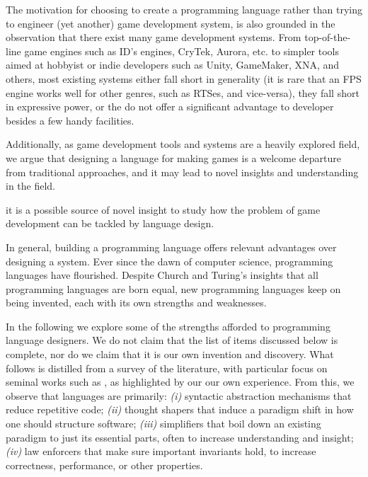 The motivation for choosing to create a programming language rather than trying to engineer (yet another) game development system, is also grounded in the observation that there exist many game development systems. From top-of-the-line game engines such as ID's engines, CryTek, Aurora, etc. to simpler tools aimed at hobbyist or indie developers such as Unity, GameMaker, XNA, and others, most existing systems either fall short in generality (it is rare that an FPS engine works well for other genres, such as RTSes, and vice-versa), they fall short in expressive power, or the do not offer a significant advantage to developer besides a few handy facilities.

Additionally, as game development tools and systems are a heavily explored field, we argue that designing a language for making games is a welcome departure from traditional approaches, and it may lead to novel insights and understanding in the field.

it is a possible source of novel insight to study how the problem of game development can be tackled by language design.

In general, building a programming language offers relevant advantages over designing a system. Ever since the dawn of computer science, programming languages have flourished. Despite Church and Turing's insights that all programming languages are born equal, new programming languages keep on being invented, each with its own strengths and weaknesses. 

In the following we explore some of the strengths afforded to programming language designers. We do not claim that the list of items discussed below is complete, nor do we claim that it is our own invention and discovery. What follows is distilled from a survey of the literature, with particular focus on seminal works such as \cite{CHAPTER_1_PL_OBJECTS, CHAPTER_1_CODE_MANAGEMENT, CHAPTER_1_PL_INFLUENCE_ON_PL, CHAPTER_1_PL_TYPE_SYSTEMS_AND_MEMORY_ALIGNMENT, CHAPTER_1_PL_AND_SWENG, CHAPTER_1_TESTING_DOES_NOT_WORK}, as highlighted by our our own experience. From this, we observe that languages are primarily: \textit{(i)} syntactic abstraction mechanisms that reduce repetitive code; \textit{(ii)} thought shapers that induce a paradigm shift in how one should structure software; \textit{(iii)} simplifiers that boil down an existing paradigm to just its essential parts, often to increase understanding and insight; \textit{(iv)} law enforcers that make sure important invariants hold, to increase correctness, performance, or other properties. 

